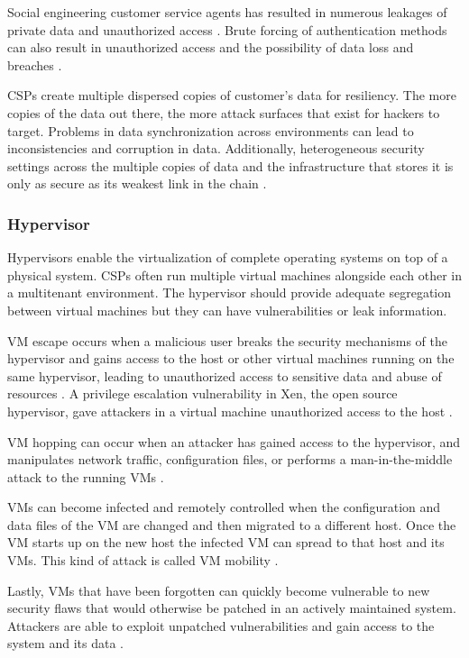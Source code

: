 \documentclass[12pt]{article}
\begin{document}
Social engineering customer service agents has resulted in numerous leakages of private data and unauthorized access \cite{amazonse,icloudse}. Brute forcing of authentication methods can also result in unauthorized access and the possibility of data loss and breaches \cite{alertlogicsecurity}.

CSPs create multiple dispersed copies of customer's data for resiliency. The more copies of the data out there, the more attack surfaces that exist for hackers to target. Problems in data synchronization across environments can lead to inconsistencies and corruption in data. Additionally, heterogeneous security settings across the multiple copies of data and the infrastructure that stores it is only as secure as its weakest link in the chain \cite{liu2015survey}.


\subsubsection{Hypervisor}

Hypervisors enable the virtualization of complete operating systems on top of a physical system. CSPs often run multiple virtual machines alongside each other in a multitenant environment. The hypervisor should provide adequate segregation between virtual machines but they can have vulnerabilities or leak information.

VM escape occurs when a malicious user breaks the security mechanisms of the hypervisor and gains access to the host or other virtual machines running on the same hypervisor, leading to unauthorized access to sensitive data and abuse of resources \cite{owens2009securing}. A privilege escalation vulnerability in Xen, the open source hypervisor, gave attackers in a virtual machine unauthorized access to the host \cite{xenprivilege}.

VM hopping can occur when an attacker has gained access to the hypervisor, and manipulates network traffic, configuration files, or performs a man-in-the-middle attack to the running VMs \cite{hyde2009survey}.

VMs can become infected and remotely controlled when the configuration and data files of the VM are changed and then migrated to a different host. Once the VM starts up on the new host the infected VM can spread to that host and its VMs. This kind of attack is called VM mobility \cite{hyde2009survey,zhang2011virtualization}.

Lastly, VMs that have  been forgotten can quickly become vulnerable to new security flaws that would otherwise be patched in an actively maintained system. Attackers are able to exploit unpatched vulnerabilities and gain access to the system and its data \cite{jasti2010security}.
\end{document}

